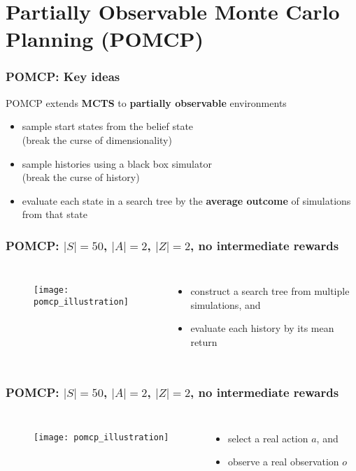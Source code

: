 \section{Partially Observable Monte Carlo Planning (POMCP)}

\begin{frame}
\frametitle{POMCP: Key ideas}
POMCP extends \textbf{MCTS} to \textbf{partially observable} environments
\pause
\begin{itemize}
    \item sample start states from the belief state \\
    (break the curse of dimensionality) \pause
    \item sample histories using a black box simulator \\
    (break the curse of history) \pause
    \item evaluate each state in a search tree by the \textbf{average outcome} of simulations from that state
\end{itemize}

\end{frame}

\begin{frame}
\frametitle{POMCP: $|S|= 50$, $|A|=2$, $|Z|=2$, {\small no intermediate rewards}}
\begin{columns}
    \begin{figure}
        \centering
        \texttt{[image: pomcp\_illustration]}
    \end{figure}
    \begin{itemize}
        \item construct a search tree from multiple simulations, and
        \item evaluate each history by its mean return
    \end{itemize}
\end{columns}
\end{frame}

\begin{frame}
\frametitle{POMCP: $|S|= 50$, $|A|=2$, $|Z|=2$, {\small no intermediate rewards}}
\begin{columns}
    \begin{figure}
        \centering
        \texttt{[image: pomcp\_illustration]}
    \end{figure}
    \begin{itemize}
        \item select a real action $a$, and
        \item observe a real observation $o$
    \end{itemize}
\end{columns}
\end{frame}

